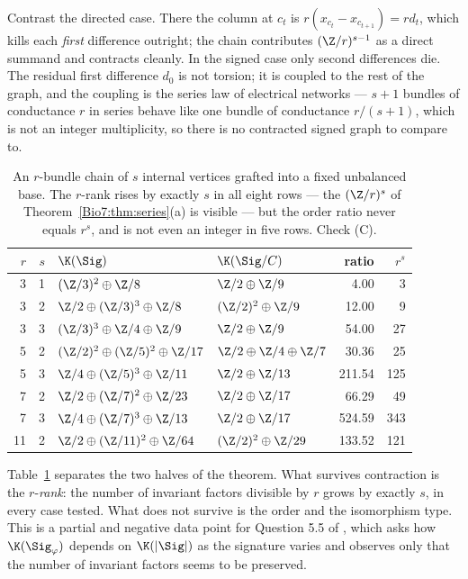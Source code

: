 Contrast the directed case. There the column at $c_t$ is $r(x_{c_t}-x_{c_{t+1}})=r d_t$,
which kills each \emph{first} difference outright; the chain contributes $(\Z/r)^{s-1}$ as a
direct summand and contracts cleanly. In the signed case only second differences die. The
residual first difference $d_0$ is not torsion; it is coupled to the rest of the graph, and
the coupling is the series law of electrical networks --- $s{+}1$ bundles of conductance $r$
in series behave like one bundle of conductance $r/(s{+}1)$, which is not an integer
multiplicity, so there is no contracted signed graph to compare to.

\begin{table}[t]
\centering
\begin{tabular}{rrllrr}
\toprule
$r$ & $s$ & $\K(\Sig)$ & $\K(\Sig/C)$ & ratio & $r^s$\\
\midrule
 3 & 1 & $(\Z/3)^2\oplus\Z/8$              & $\Z/2\oplus\Z/9$          &   4.00 &   3\\
 3 & 2 & $\Z/2\oplus(\Z/3)^3\oplus\Z/8$    & $(\Z/2)^2\oplus\Z/9$      &  12.00 &   9\\
 3 & 3 & $(\Z/3)^3\oplus\Z/4\oplus\Z/9$    & $\Z/2\oplus\Z/9$          &  54.00 &  27\\
 5 & 2 & $(\Z/2)^2\oplus(\Z/5)^2\oplus\Z/17$ & $\Z/2\oplus\Z/4\oplus\Z/7$ & 30.36 &  25\\
 5 & 3 & $\Z/4\oplus(\Z/5)^3\oplus\Z/11$   & $\Z/2\oplus\Z/13$         & 211.54 & 125\\
 7 & 2 & $\Z/2\oplus(\Z/7)^2\oplus\Z/23$   & $\Z/2\oplus\Z/17$         &  66.29 &  49\\
 7 & 3 & $\Z/4\oplus(\Z/7)^3\oplus\Z/13$   & $\Z/2\oplus\Z/17$         & 524.59 & 343\\
11 & 2 & $\Z/2\oplus(\Z/11)^2\oplus\Z/64$  & $(\Z/2)^2\oplus\Z/29$     & 133.52 & 121\\
\bottomrule
\end{tabular}
\caption{An $r$-bundle chain of $s$ internal vertices grafted into a fixed unbalanced base.
The $r$-rank rises by exactly $s$ in all eight rows --- the $(\Z/r)^s$ of
Theorem~\ref{Bio7:thm:series}(a) is visible --- but the order ratio never equals $r^s$, and is
not even an integer in five rows. Check (C).}
\label{Bio7:tab:series}
\end{table}

Table~\ref{Bio7:tab:series} separates the two halves of the theorem. What survives contraction is
the $r$-\emph{rank}: the number of invariant factors divisible by $r$ grows by exactly $s$,
in every case tested. What does not survive is the order and the isomorphism type. This is a
partial and negative data point for Question 5.5 of \cite{CDIOSZ}, which asks how
$\K(\Sig_\varphi)$ depends on $\K(|\Sig|)$ as the signature varies and observes only that the
number of invariant factors seems to be preserved.

